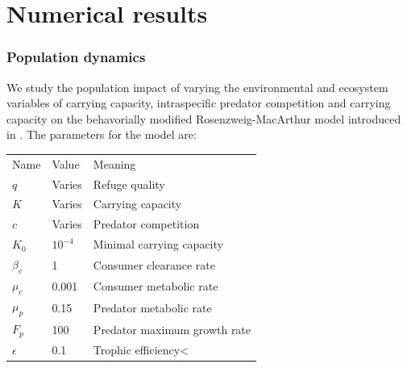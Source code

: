 \section{Numerical results}

\subsubsection{Population dynamics}
We study the population impact of varying the environmental and ecosystem variables of carrying capacity, intraspecific predator competition and carrying capacity on the behavorially modified Rosenzweig-MacArthur model introduced in .
The parameters for the model are: \\
\begin{tabular}{l l l}
  Name & Value & Meaning \\
  $q$ & Varies & Refuge quality \\
  $K$ & Varies & Carrying capacity \\
  $c$ & Varies & Predator competition \\
  $K_0$ & $10^{-4}$ & Minimal carrying capacity \\
  $\beta_c$ & 1 & Consumer clearance rate \\
  $\mu_c$ & 0.001 & Consumer metabolic rate \\
  $\mu_p$ & 0.15 & Predator metabolic rate \\
  $F_p$ & 100 & Predator maximum growth rate \\
  $\epsilon$ & 0.1 & Trophic efficiency<
\end{tabular}

